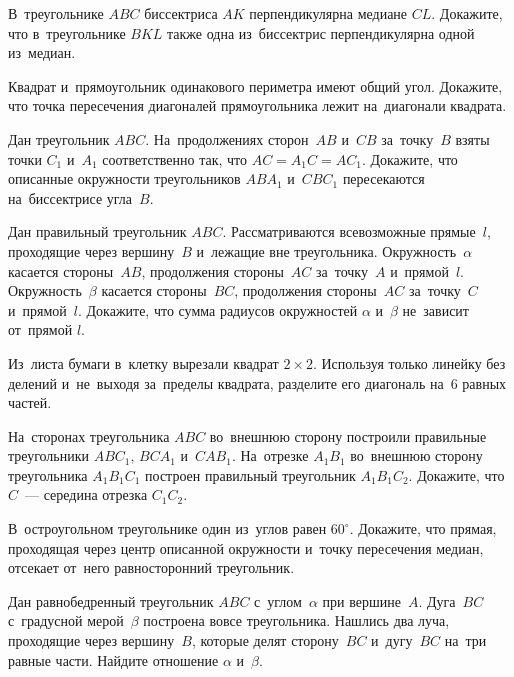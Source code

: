 


\begin{problems}

\item
В~треугольнике $ABC$ биссектриса $AK$ перпендикулярна медиане $CL$.
Докажите, что в~треугольнике $BKL$ также одна из~биссектрис перпендикулярна
одной из~медиан.

\item
Квадрат и~прямоугольник одинакового периметра имеют общий угол.
Докажите, что точка пересечения диагоналей прямоугольника лежит на~диагонали
квадрата.

\item
Дан треугольник $ABC$.
На~продолжениях сторон~$AB$ и~$CB$ за~точку~$B$ взяты точки $C_1$ и~$A_1$
соответственно так, что $AC = A_1 C = A C_1$.
Докажите, что описанные окружности треугольников $A B A_1$ и~$C B C_1$
пересекаются на~биссектрисе угла~$B$.

\item
Дан правильный треугольник $ABC$.
Рассматриваются всевозможные прямые~$l$, проходящие через вершину~$B$ и~лежащие
вне треугольника.
Окружность~$\alpha$ касается стороны~$AB$, продолжения стороны~$AC$
за~точку~$A$ и~прямой~$l$.
Окружность~$\beta$ касается стороны~$BC$, продолжения стороны~$AC$ за~точку~$C$
и~прямой~$l$.
Докажите, что сумма радиусов окружностей $\alpha$ и~$\beta$ не~зависит
от~прямой $l$.

\item
Из~листа бумаги в~клетку вырезали квадрат $2 \times 2$.
Используя только линейку без делений и~не~выходя за~пределы квадрата, разделите
его диагональ на~$6$ равных частей.

\item
На~сторонах треугольника $ABC$ во~внешнюю сторону построили правильные
треугольники $A B C_1$, $B C A_1$ и~$C A B_1$.
На~отрезке $A_1 B_1$ во~внешнюю сторону треугольника $A_1 B_1 C_1$ построен
правильный треугольник $A_1 B_1 C_2$.
Докажите, что $C$~--- середина отрезка $C_1 C_2$.

\item
В~остроугольном треугольнике один из~углов равен $60^{\circ}$.
Докажите, что прямая, проходящая через центр описанной окружности и~точку
пересечения медиан, отсекает от~него равносторонний треугольник.

\item
Дан равнобедренный треугольник $ABC$ с~углом~$\alpha$ при вершине~$A$.
Дуга~$BC$ с~градусной мерой~$\beta$ построена вовсе треугольника.
Нашлись два луча, проходящие через вершину~$B$, которые делят сторону~$BC$
и~дугу~$BC$ на~три равные части.
Найдите отношение $\alpha$ и~$\beta$.

\end{problems}

